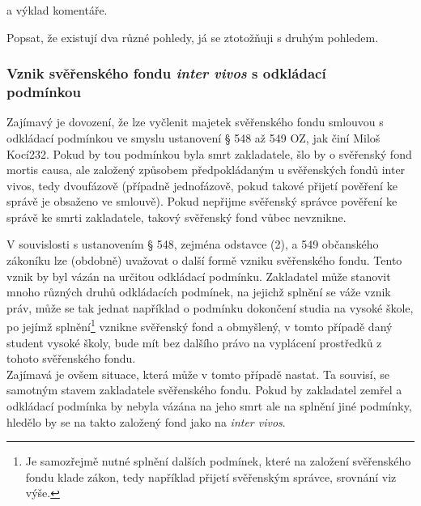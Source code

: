 \documentclass{article}
\begin{document}
a výklad komentáře.

Popsat, že existují dva různé pohledy, já se ztotožňuji s druhým pohledem.

\subsubsection[Vznik svěřenského fondu \textit{inter vivos} s odkládacé podmínkou]{Vznik svěřenského fondu \textit{inter vivos} s odkládací\\ podmínkou}

Zajímavý je dovození, že lze vyčlenit majetek svěřenského fondu smlouvou s odkládací podmínkou ve smyslu ustanovení § 548 až 549 OZ, jak činí Miloš Kocí232. Pokud by tou podmínkou byla smrt zakladatele, šlo by o svěřenský fond mortis causa, ale založený způsobem předpokládaným u svěřenských fondů inter vivos, tedy dvoufázově (případně jednofázově, pokud takové přijetí pověření ke správě je obsaženo ve smlouvě). Pokud nepřijme svěřenský správce pověření ke správě ke smrti zakladatele, takový svěřenský fond vůbec nevznikne.

V souvislosti s ustanovením § 548, zejména odstavce (2), a 549 občanského zákoníku lze (obdobně) uvažovat o další formě vzniku svěřenského fondu. Tento vznik by byl vázán na určitou odkládací podmínku. Zakladatel může stanovit mnoho různých druhů odkládacích podmínek, na jejichž splnění se váže vznik práv, může se tak jednat například o podmínku dokončení studia na vysoké škole, po jejímž splnění\footnote{Je samozřejmě nutné splnění dalších podmínek, které na založení svěřenského fondu klade zákon, tedy například přijetí svěřenským správce, srovnání viz výše.} vznikne svěřenský fond a obmyšlený, v tomto případě daný student vysoké školy, bude mít bez dalšího právo na vyplácení prostředků z tohoto svěřenského fondu.\\

Zajímavá je ovšem situace, která může v tomto případě nastat. Ta souvisí, se samotným stavem zakladatele svěřenského fondu. Pokud by zakladatel zemřel a odkládací podmínka by nebyla vázána na jeho smrt ale na splnění jiné podmínky, hledělo by se na takto založený fond jako na \textit{inter vivos}.\\

\end{document}
